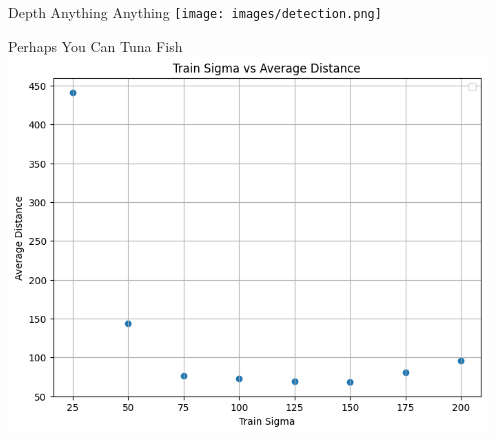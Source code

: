 \begin{frame}{Depth Anything Anything}
    \centering
    \texttt{[image: images/detection.png]}
\end{frame}

\begin{frame}{Perhaps You Can Tuna Fish}
    \centering
    \includegraphics[height=0.95\textheight,width=0.95\textwidth,keepaspectratio]{images/tuning.png}
\end{frame}